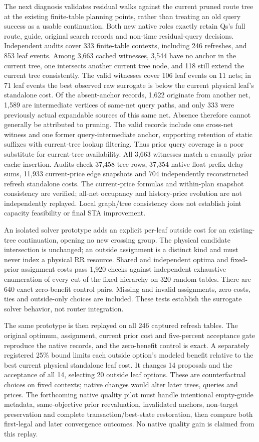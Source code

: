The next diagnosis validates residual walks against the current pruned route tree at the existing finite-table planning points, rather than treating an old query success as a usable continuation. Both new native roles exactly retain Qs's full route, guide, original search records and non-time residual-query decisions. Independent audits cover 333 finite-table contexts, including 246 refreshes, and 853 leaf events. Among 3,663 cached witnesses, 3,544 have no anchor in the current tree, one intersects another current tree node, and 118 still extend the current tree consistently. The valid witnesses cover 106 leaf events on 11 nets; in 71 leaf events the best observed raw surrogate is below the current physical leaf's standalone cost. Of the absent-anchor records, 1,622 originate from another net, 1,589 are intermediate vertices of same-net query paths, and only 333 were previously actual expandable sources of this same net. Absence therefore cannot generally be attributed to pruning. The valid records include one cross-net witness and one former query-intermediate anchor, supporting retention of static suffixes with current-tree lookup filtering. Thus prior query coverage is a poor substitute for current-tree availability. All 3,663 witnesses match a causally prior cache insertion. Audits check 37,458 tree rows, 37,354 native float prefix-delay sums, 11,933 current-price edge snapshots and 704 independently reconstructed refresh standalone costs. The current-price formulas and within-plan snapshot consistency are verified; all-net occupancy and history-price evolution are not independently replayed. Local graph/tree consistency does not establish joint capacity feasibility or final STA improvement.

An isolated solver prototype adds an explicit per-leaf outside cost for an existing-tree continuation, opening no new crossing group. The physical candidate intersection is unchanged; an outside assignment is a distinct kind and must never index a physical RR resource. Shared and independent optima and fixed-prior assignment costs pass 1,920 checks against independent exhaustive enumeration of every cut of the fixed hierarchy on 320 random tables. There are 640 exact zero-benefit control pairs. Missing and invalid assignments, zero costs, ties and outside-only choices are included. These tests establish the surrogate solver behavior, not router integration.

The same prototype is then replayed on all 246 captured refresh tables. The original optimum, assignment, current prior cost and five-percent acceptance gate reproduce the native records, and the zero-benefit control is exact. A separately registered 25\% bound limits each outside option's modeled benefit relative to the best current physical standalone leaf cost. It changes 14 proposals and the acceptance of all 14, selecting 20 outside leaf options. These are counterfactual choices on fixed contexts; native changes would alter later trees, queries and prices. The forthcoming native quality pilot must handle intentional empty-guide metadata, same-objective prior reevaluation, invalidated anchors, non-target preservation and complete transaction/best-state restoration, then compare both first-legal and later convergence outcomes. No native quality gain is claimed from this replay.

